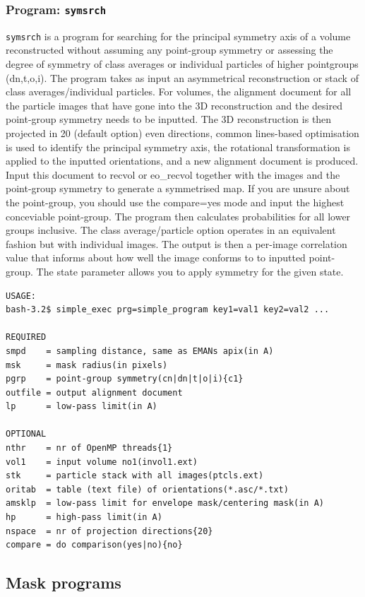 \documentclass[a4paper,11pt]{article}
\newcommand{\prgname}[1]{\textcolor{NavyBlue}{\texttt{#1}}}
\begin{document}
\subsubsection{Program: \prgname{symsrch}}
\label{symsrch}
\prgname{symsrch} is a program for searching for the principal symmetry axis of a volume reconstructed without assuming any point-group symmetry or assessing the degree of symmetry of class averages or individual particles of higher pointgroups (dn,t,o,i). The program takes as input an asymmetrical reconstruction or stack of class averages/individual particles. For volumes, the alignment document for all the particle images that have gone into the 3D reconstruction and the desired point-group symmetry needs to be inputted. The 3D reconstruction is then projected in 20 (default option) even directions, common lines-based optimisation is used to identify the principal symmetry axis, the rotational transformation is applied to the inputted orientations, and a new alignment document is produced. Input this document to recvol or eo\_recvol together with the images and the point-group symmetry to generate a symmetrised map. If you are unsure about the point-group, you should use the compare=yes mode and input the highest conceviable point-group. The program then calculates probabilities for all lower groups inclusive. The class average/particle option operates in an equivalent fashion but with individual images. The output is then a per-image correlation value that informs about how well the image conforms to to inputted point-group. The state parameter allows you to apply symmetry for the given state.

\begin{verbatim}
USAGE:
bash-3.2$ simple_exec prg=simple_program key1=val1 key2=val2 ...

REQUIRED
smpd    = sampling distance, same as EMANs apix(in A)
msk     = mask radius(in pixels)
pgrp    = point-group symmetry(cn|dn|t|o|i){c1}
outfile = output alignment document
lp      = low-pass limit(in A)

OPTIONAL
nthr    = nr of OpenMP threads{1}
vol1    = input volume no1(invol1.ext)
stk     = particle stack with all images(ptcls.ext)
oritab  = table (text file) of orientations(*.asc/*.txt)
amsklp  = low-pass limit for envelope mask/centering mask(in A)
hp      = high-pass limit(in A)
nspace  = nr of projection directions{20}
compare = do comparison(yes|no){no}
\end{verbatim}

\subsection{Mask programs}
\end{document}
